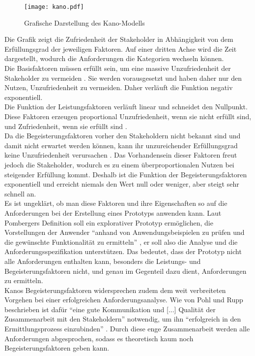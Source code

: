 \documentclass [12pt, a4paper, oneside, titlepage, ngerman]{article}
\begin{document}
\begin{figure}[H]
	\centering
	\texttt{[image: kano.pdf]}
	\caption{Grafische Darstellung des Kano-Modells}
	\cite[S.25]{PohlRupp2015}
	\label{img:kano}
\end{figure}
\noindent Die Grafik zeigt die Zufriedenheit der Stakeholder in Abhängigkeit von dem Erfüllungsgrad der jeweiligen Faktoren. Auf einer dritten Achse wird die Zeit dargestellt, wodurch die Anforderungen die Kategorien wechseln können. \\
Die Basisfaktoren müssen erfüllt sein, um eine massive Unzufriedenheit der Stakeholder zu vermeiden \cite[vgl. S.106]{Kano}. Sie werden vorausgesetzt und haben daher nur den Nutzen, Unzufriedenheit zu vermeiden. Daher verläuft die Funktion negativ exponentiell. \\
Die Funktion der Leistungsfaktoren verläuft linear und schneidet den Nullpunkt. Diese Faktoren erzeugen proportional Unzufriedenheit, wenn sie nicht erfüllt sind, und Zufriedenheit, wenn sie erfüllt sind \cite[vgl. S.106]{Kano}. \\
Da die Begeisterungsfaktoren vorher den Stakeholdern nicht bekannt sind und damit nicht erwartet werden können, kann ihr unzureichender Erfüllungsgrad keine Unzufriedenheit verursachen \cite[vgl. S.106]{Kano}. Das Vorhandensein dieser Faktoren freut jedoch die Stakeholder, wodurch es zu einem überproportionalen Nutzen bei steigender Erfüllung kommt. Deshalb ist die Funktion der Begeisterungsfaktoren exponentiell und erreicht niemals den Wert null oder weniger, aber steigt sehr schnell an. \\

\noindent Es ist ungeklärt, ob man diese Faktoren und ihre Eigenschaften so auf die Anforderungen bei der Erstellung eines Prototyps anwenden kann. Laut Pombergers Definition soll ein explorativer Prototyp ermöglichen, die Vorstellungen der Anwender "`anhand von Anwendungsbeispielen zu prüfen und die gewünschte Funktionalität zu ermitteln"' \cite[S.27]{pomberger2004}, er soll also die Analyse und die Anforderungsspezifikation unterstützen. Das bedeutet, dass der Prototyp nicht alle Anforderungen enthalten kann, besonders die Leistungs- und Begeisterungsfaktoren nicht, und genau im Gegenteil dazu dient, Anforderungen zu ermitteln. \\
Kanos Begeisterungsfaktoren widersprechen zudem dem weit verbreiteten Vorgehen bei einer erfolgreichen Anforderungsanalyse. Wie von Pohl und Rupp beschrieben ist dafür "`eine gute Kommunikation und [...] Qualität der Zusammenarbeit mit den Stakeholdern"' \cite[S.33]{PohlRupp2015} notwendig, um ihn "`erfolgreich in den Ermittlungsprozess einzubinden"' \cite[S.34]{PohlRupp2015}. Durch diese enge Zusammenarbeit werden alle Anforderungen abgesprochen, sodass es theoretisch kaum noch Begeisterungsfaktoren geben kann.
\end{document}
